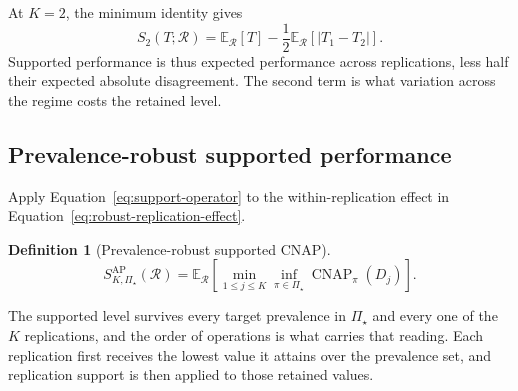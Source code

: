 \documentclass[11pt]{article}
\newcommand{\CNAP}{\operatorname{CNAP}}
\newcommand{\Regime}{\mathcal{R}}
\newcommand{\PSet}{\Pi_\star}
\newcommand{\E}{\mathbb{E}}
\newcommand{\SRob}{S_{K,\PSet}^{\mathrm{AP}}(\Regime)}
\newtheorem{definition}{Definition}
\theoremstyle{remark}
\begin{document}
At $K=2$, the minimum identity gives
\begin{equation}
S_2(T;\Regime)
=
\E_{\Regime}[T]
-
\frac12
\E_{\Regime}
\left[
|T_1-T_2|
\right].
\label{eq:k2-decomposition}
\end{equation}
Supported performance is thus expected performance across replications, less half their expected absolute disagreement. The second term is what variation across the regime costs the retained level.

\subsection{Prevalence-robust supported performance}

Apply Equation~\eqref{eq:support-operator} to the within-replication effect in Equation~\eqref{eq:robust-replication-effect}.

\begin{definition}[Prevalence-robust supported CNAP]
\begin{equation}
\SRob
=
\E_{\Regime}
\left[
\min_{1\leq j\leq K}
\inf_{\pi\in\PSet}
\CNAP_\pi(D_j)
\right].
\label{eq:robust-support}
\end{equation}
\end{definition}

The supported level survives every target prevalence in $\PSet$ and every one of the $K$ replications, and the order of operations is what carries that reading. Each replication first receives the lowest value it attains over the prevalence set, and replication support is then applied to those retained values.
\end{document}

